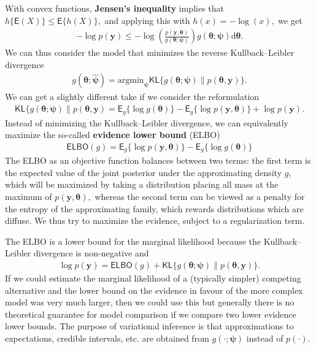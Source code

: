 \documentclass[
  11pt,
  letterpaper,
]{scrbook}
\theoremstyle{definition}
\theoremstyle{definition}
\theoremstyle{definition}
\theoremstyle{plain}
\theoremstyle{plain}
\theoremstyle{plain}
\theoremstyle{remark}
\begin{document}
With convex functions, \textbf{Jensen's inequality} implies that
\(h\{\mathsf{E}(X)\} \leq \mathsf{E}\{h(X)\},\) and applying this with
\(h(x)=-\log(x),\) we get \begin{align*}
-\log p(\boldsymbol{y}) \leq - \log  \left(\frac{p(\boldsymbol{y}, \boldsymbol{\theta})}{g(\boldsymbol{\theta};\boldsymbol{\psi})}\right) g(\boldsymbol{\theta};\boldsymbol{\psi}) \mathrm{d} \boldsymbol{\theta}.
\end{align*} We can thus consider the model that minimizes the reverse
Kullback--Leibler divergence \begin{align*}
g(\boldsymbol{\theta}; \widehat{\boldsymbol{\psi}}) = \mathrm{argmin}_{\boldsymbol{\psi}} \mathsf{KL}\{g(\boldsymbol{\theta};\boldsymbol{\psi}) \parallel p(\boldsymbol{\theta}, \boldsymbol{y})\}.
\end{align*} We can get a slightly different take if we consider the
reformulation \begin{align*}
\mathsf{KL}\{g(\boldsymbol{\theta};\boldsymbol{\psi}) \parallel p(\boldsymbol{\theta}, \boldsymbol{y}) = \mathsf{E}_{g}\{\log g(\boldsymbol{\theta})\} - \mathsf{E}_g\{\log p(\boldsymbol{y}, \boldsymbol{\theta})\} + \log p(\boldsymbol{y}).
\end{align*} Instead of minimizing the Kullback--Leibler divergence, we
can equivalently maximize the so-called \textbf{evidence lower bound}
(ELBO) \begin{align*}
\mathsf{ELBO}(g) = \mathsf{E}_g\{\log p(\boldsymbol{y}, \boldsymbol{\theta})\} - \mathsf{E}_{g}\{\log g(\boldsymbol{\theta})\}
\end{align*} The ELBO as an objective function balances between two
terms: the first term is the expected value of the joint posterior under
the approximating density \(g,\) which will be maximized by taking a
distribution placing all mass at the maximum of
\(p(\boldsymbol{y}, \boldsymbol{\theta}),\) whereas the second term can
be viewed as a penalty for the entropy of the approximating family,
which rewards distributions which are diffuse. We thus try to maximize
the evidence, subject to a regularization term.

The ELBO is a lower bound for the marginal likelihood because the
Kullback--Leibler divergence is non-negative and \begin{align*}
\log p(\boldsymbol{y}) = \mathsf{ELBO}(g) +  \mathsf{KL}\{g(\boldsymbol{\theta};\boldsymbol{\psi}) \parallel p(\boldsymbol{\theta}, \boldsymbol{y})\}.
\end{align*} If we could estimate the marginal likelihood of a
(typically simpler) competing alternative and the lower bound on the
evidence in favour of the more complex model was very much larger, then
we could use this but generally there is no theoretical guarantee for
model comparison if we compare two lower evidence lower bounds. The
purpose of variational inference is that approximations to expectations,
credible intervals, etc. are obtained from
\(g(\cdot; \boldsymbol{\psi})\) instead of \(p(\cdot).\)
\end{document}
